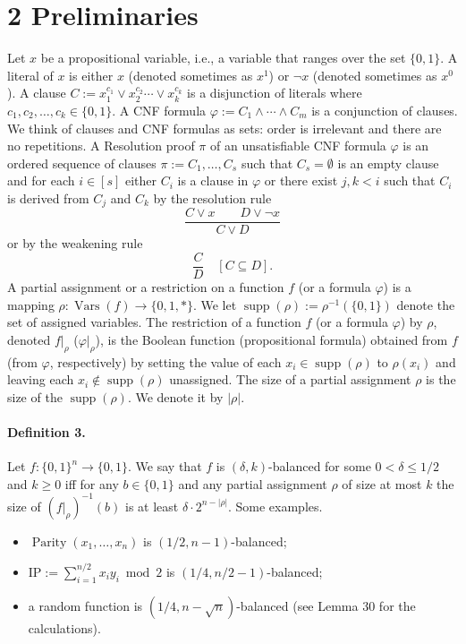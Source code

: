 \section*{2 Preliminaries}
Let $x$ be a propositional variable, i.e., a variable that ranges over the set $\{0,1\}$. A literal of $x$ is either $x$ (denoted sometimes as $x^1$) or $\neg x$ (denoted sometimes as $x^0$). A clause $C:=x_1^{c_1}\vee x_2^{c_2}\cdots\vee x_k^{c_k}$ is a disjunction of literals where $c_1,c_2,\ldots,c_k\in\{0,1\}$. A CNF formula $\varphi:=C_1\wedge\cdots\wedge C_m$ is a conjunction of clauses. We think of clauses and CNF formulas as sets: order is irrelevant and there are no repetitions.
A Resolution proof $\pi$ of an unsatisfiable CNF formula $\varphi$ is an ordered sequence of clauses $\pi:=C_1,\ldots,C_s$ such that $C_s=\emptyset$ is an empty clause and for each $i\in[s]$ either $C_i$ is a clause in $\varphi$ or there exist $j,k<i$ such that $C_i$ is derived from $C_j$ and $C_k$ by the resolution rule
\[\frac{C\vee x\qquad D\vee\neg x}{C\vee D}\]
or by the weakening rule
\[\frac CD\quad[C\subseteq D].\]
A partial assignment or a restriction on a function $f$ (or a formula $\varphi$) is a mapping $\rho:\operatorname{Vars}(f)\to\{0,1,*\}$. We let $\operatorname{supp}(\rho):=\rho^{-1}(\{0,1\})$ denote the set of assigned variables. The restriction of a function $f$ (or a formula $\varphi$) by $\rho$, denoted $f|_\rho$ ($\varphi|_\rho$), is the Boolean function (propositional formula) obtained from $f$ (from $\varphi$, respectively) by setting the value of each $x_i\in\operatorname{supp}(\rho)$ to $\rho(x_i)$ and leaving each $x_i\notin\operatorname{supp}(\rho)$ unassigned.
The size of a partial assignment $\rho$ is the size of the $\operatorname{supp}(\rho)$. We denote it by $|\rho|$.
\paragraph{Definition 3.} Let $f:\{0,1\}^n\to\{0,1\}$. We say that $f$ is $(\delta,k)$-balanced for some $0<\delta\leq1/2$ and $k\geq0$ iff for any $b\in\{0,1\}$ and any partial assignment $\rho$ of size at most $k$ the size of $(f|_\rho)^{-1}(b)$ is at least $\delta\cdot2^{n-|\rho|}$.
Some examples.
\begin{itemize}
\item $\operatorname{Parity}(x_1,\ldots,x_n)$ is $(1/2,n-1)$-balanced;
\item $\mathrm{IP}:=\sum_{i=1}^{n/2}x_iy_i\bmod2$ is $(1/4,n/2-1)$-balanced;
\item a random function is $(1/4,n-\sqrt n)$-balanced (see Lemma 30 for the calculations).
\end{itemize}
